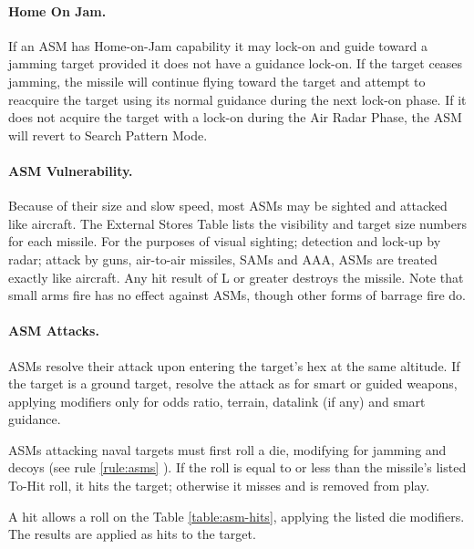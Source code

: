 \begin{advancedrules}
\paragraph{Home On Jam.} If an ASM has Home-on-Jam capability it may lock-on and guide toward a jamming target provided it does not have a guidance lock-on. If the target ceases jamming, the missile will continue flying toward the target and attempt to reacquire the target using its normal guidance during the next lock-on phase.  If it does not acquire the target with a lock-on during the Air Radar Phase, the ASM will revert to Search Pattern Mode.  

\paragraph{ASM Vulnerability.}  Because of their size and slow speed, most ASMs may be sighted and attacked like aircraft.  The External Stores Table lists the visibility and target size numbers for each missile.  For the purposes of visual sighting; detection and lock-up by radar; attack by guns, air-to-air missiles, SAMs and AAA, ASMs are treated exactly like aircraft.  Any hit result of L or greater destroys the missile.  Note that small arms fire has no effect against ASMs, though other forms of barrage fire do.

\paragraph{ASM Attacks.} ASMs resolve their attack upon entering the target's hex at the same altitude.  If the target is a ground target, resolve the attack as for smart or guided weapons, applying modifiers only for odds ratio, terrain, datalink (if any) and smart guidance.

ASMs attacking naval targets must first roll a die, modifying for jamming and decoys (see rule \ref{rule:asms}
).  If the roll is equal to or less than the missile's listed To-Hit roll, it hits the target; otherwise it misses and is removed from play. 

A hit allows a roll on the Table \ref{table:asm-hits}, applying the listed die modifiers.  The results are applied as hits to the target.



\end{advancedrules}
